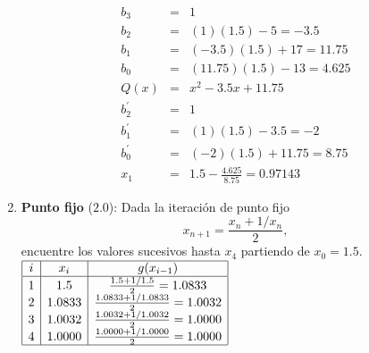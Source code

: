 \documentclass[12pt]{article}
\begin{document}
\begin{enumerate}[leftmargin=*,widest=9]
\begin{eqnarray*}
b_3 & = & 1 \\
b_2 & = & (1)(1.5) - 5 = -3.5\\
b_1 & = & (-3.5)(1.5) + 17 = 11.75\\
b_0 & = & (11.75)(1.5) - 13 = 4.625 \\
Q(x) & = & x^2 - 3.5x + 11.75 \\
b^\prime_2 & = & 1 \\
b^\prime_1 & = & (1)(1.5) - 3.5 = -2\\
b^\prime_0 & = & (-2)(1.5) + 11.75 = 8.75\\
x_1 & = & 1.5 - \frac{4.625}{8.75} = 0.97143
\end{eqnarray*}
    \item \textbf{Punto fijo} ($2.0$): Dada la iteración de punto fijo \[ x_{n+1} = \frac{x_n + 1/x_n}{2},\] encuentre los valores sucesivos hasta \(x_4\) partiendo de \(x_0=1.5\).
 \centering   \( \begin{array}{|c|c|c|}
    \hline
    i & x_i & g(x_{i-1})\\
    \hline
    1 & 1.5 & \frac{1.5 + 1/1.5}{2} = 1.0833\\
    2 & 1.0833 & \frac{1.0833 + 1/1.0833}{2} = 1.0032\\
    3 & 1.0032 & \frac{1.0032 + 1/1.0032}{2} = 1.0000\\
    4 & 1.0000 & \frac{1.0000 + 1/1.0000}{2} = 1.0000\\
    \hline
    \end{array} \)
  \end{enumerate}
\end{document}
